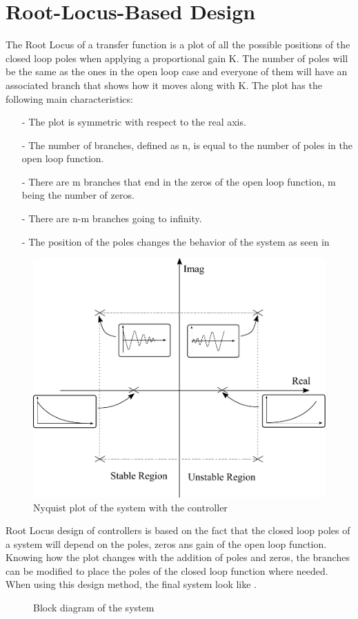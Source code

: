 \section{Root-Locus-Based Design}\label{rLocus}
The Root Locus of a transfer function is a plot of all the possible positions of the closed loop poles when applying a proportional gain K. The number of poles will be the same as the ones in the open loop case and everyone of them will have an associated branch that shows how it moves along with K. The plot has the following main characteristics:

\begin{itemize}
	\item[-] The plot is symmetric with respect to the real axis.
	\item[-] The number of branches, defined as n, is equal to the number of poles in the open loop function.
	\item[-] There are m branches that end in the zeros of the open loop function, m being the number of zeros.
	\item[-] There are n-m branches going to infinity.
	\item[-] The position of the poles changes the behavior of the system as seen in 
\end{itemize}

\begin{figure}[H] 
	\centering 
	\includegraphics[scale=0.5]{figures/rLocusStability}	
	\caption{Nyquist plot of the system with the controller}
	\label{rLocusStability}
\end{figure}
%
Root Locus design of controllers is based on the fact that the closed loop poles of a system will depend on the poles, zeros ans gain of the open loop function. Knowing how the plot changes with the addition of poles and zeros, the branches can be modified to place the poles of the closed loop function where needed. When using this design method, the final system look like .

\begin{figure}[H]
	
	\centering
	\caption{Block diagram of the system}
	\label{blockDiagramController}
\end{figure}

